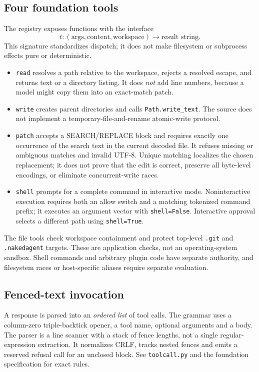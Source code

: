 \documentclass[10pt,twocolumn,letterpaper]{article}
\begin{document}
\subsection{Four foundation tools}
The registry exposes functions with the interface
\[
 t:(\text{args},\text{content},\text{workspace})\longrightarrow\text{result string}.
\]
This signature standardizes dispatch; it does not make filesystem or subprocess effects pure or deterministic.

\begin{itemize}
\item \texttt{read} resolves a path relative to the workspace, rejects a resolved escape, and returns text or a directory listing. It does \emph{not} add line numbers, because a model might copy them into an exact-match patch.
\item \texttt{write} creates parent directories and calls \texttt{Path.write\_text}. The source does not implement a temporary-file-and-rename atomic-write protocol.
\item \texttt{patch} accepts a SEARCH/REPLACE block and requires exactly one occurrence of the search text in the current decoded file. It refuses missing or ambiguous matches and invalid UTF-8. Unique matching localizes the chosen replacement; it does not prove that the edit is correct, preserve all byte-level encodings, or eliminate concurrent-write races.
\item \texttt{shell} prompts for a complete command in interactive mode. Noninteractive execution requires both an allow switch and a matching tokenized command prefix; it executes an argument vector with \texttt{shell=False}. Interactive approval selects a different path using \texttt{shell=True}.
\end{itemize}

The file tools check workspace containment and protect top-level \texttt{.git} and \texttt{.nakedagent} targets. These are application checks, not an operating-system sandbox. Shell commands and arbitrary plugin code have separate authority, and filesystem races or host-specific aliases require separate evaluation.

\subsection{Fenced-text invocation}
A response is parsed into an \emph{ordered list} of tool calls. The grammar uses a column-zero triple-backtick opener, a tool name, optional arguments and a body. The parser is a line scanner with a stack of fence lengths, not a single regular-expression extraction. It normalizes CRLF, tracks nested fences and emits a reserved refusal call for an unclosed block. See \texttt{toolcall.py} and the foundation specification for exact rules.
\end{document}
